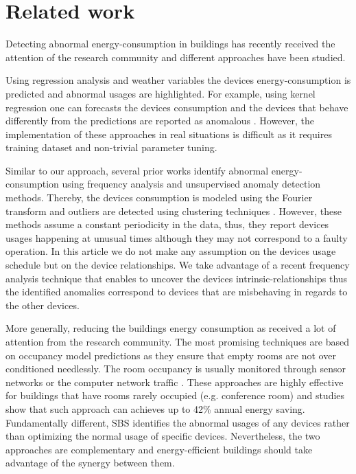 \section{Related work}
Detecting abnormal energy-consumption in buildings has recently received the attention of the research community and different approaches have been studied.

Using regression analysis and weather variables the devices energy-consumption is predicted and abnormal usages are highlighted.
For example, using kernel regression one can forecasts the devices consumption and the devices that behave differently from the predictions are reported as anomalous \cite{brown:buildperf2012}.
However, the implementation of these approaches in real situations is difficult as it requires training dataset and non-trivial parameter tuning.

Similar to our approach, several prior works identify abnormal energy-consumption using frequency analysis and unsupervised anomaly detection methods.
Thereby, the devices consumption is modeled using the Fourier transform and outliers are detected using clustering techniques \cite{Bellala_buildsys11,wrinch:pes2012,chen:aaaiw2011}. %
However, these methods assume a constant periodicity in the data, thus, they report devices usages happening at unusual times although they may not correspond to a faulty operation.
In this article we do not make any assumption on the devices usage schedule but on the device relationships.
We take advantage of a recent frequency analysis technique that enables to uncover the devices intrinsic-relationships \cite{romain:iotapp12} thus the identified anomalies correspond to devices that are misbehaving in regards to the other devices.

More generally, reducing the buildings energy consumption as received a lot of attention from the research community.
The most promising techniques are based on occupancy model predictions as they ensure that empty rooms are not over conditioned needlessly.
The room occupancy is usually monitored through sensor networks \cite{agarwal:ipsn2011,erickson:ipsn2011} or the computer network traffic \cite{kim:buildsys2010}.
These approaches are highly effective for buildings that have rooms rarely occupied (e.g. conference room) and studies show that such approach can achieves up to 42\% annual energy saving.
Fundamentally different, SBS identifies the abnormal usages of any devices rather than optimizing the normal usage of specific devices.
Nevertheless, the two approaches are complementary and energy-efficient buildings should take advantage of the synergy between them.







